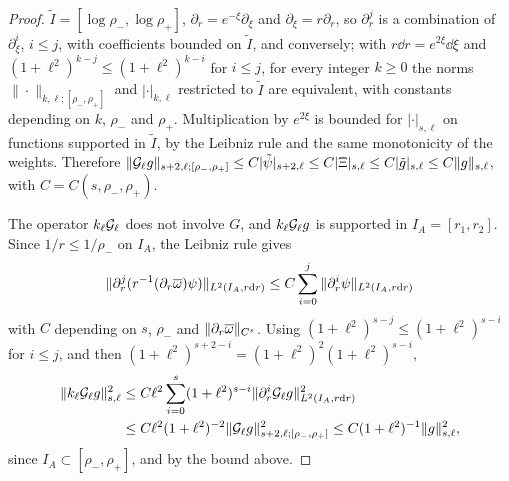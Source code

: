 \begin{proof}
$\tilde I=[\log\rho_-,\log\rho_+]$, $\partial_r=e^{-\xi}\partial_\xi$ and $\partial_\xi=r\partial_r$,
so $\partial_r^j$ is a combination of $\partial_\xi^i$, $i\le j$, with coefficients
bounded on $\tilde I$, and conversely; with $r\dd r=e^{2\xi}\dd\xi$ and
$(1+\ell^2)^{k-j}\le(1+\ell^2)^{k-i}$ for $i\le j$, for every integer $k\ge0$ the norms
$\|\cdot\|_{k,\ell;[\rho_-,\rho_+]}$ and $|\cdot|_{k,\ell}$ restricted to $\tilde I$ are
equivalent, with constants depending on $k$, $\rho_-$ and $\rho_+$. Multiplication
by $e^{2\xi}$ is bounded for $|\cdot|_{s,\ell}$ on functions supported in $\tilde I$,
by the Leibniz rule and the same monotonicity of the weights. Therefore
$\|\mathcal{G}_\ell g\|_{s+2,\ell;[\rho_-,\rho_+]}\le C|\tilde\psi|_{s+2,\ell}\le C|\Xi|_{s,\ell}
\le C|\tilde g|_{s,\ell}\le C\|g\|_{s,\ell}$, with $C=C(s,\rho_-,\rho_+)$.

The operator $k_\ell\mathcal{G}_\ell$ does not involve $G$, and
$k_\ell\mathcal{G}_\ell g$ is supported in $I_A=[r_1,r_2]$. Since $1/r\le1/\rho_-$ on
$I_A$, the Leibniz rule gives
\[
\|\partial_r^j(r^{-1}(\partial_r\overline{\omega})\psi)\|_{L^2(I_A,r\dd r)}\le C\sum_{i=0}^{j}\|\partial_r^i\psi\|_{L^2(I_A,r\dd r)}
\]
with $C$ depending on $s$, $\rho_-$ and $\|\partial_r\overline{\omega}\|_{C^s}$. Using
$(1+\ell^2)^{s-j}\le(1+\ell^2)^{s-i}$ for $i\le j$, and then
$(1+\ell^2)^{s+2-i}=(1+\ell^2)^2(1+\ell^2)^{s-i}$,
\begin{align*}
\|k_\ell\mathcal{G}_\ell g\|_{s,\ell}^2&\le C\ell^2\sum_{i=0}^{s}(1+\ell^2)^{s-i}\|\partial_r^i\mathcal{G}_\ell g\|^2_{L^2(I_A,r\dd r)}\\
&\le C\ell^2(1+\ell^2)^{-2}\|\mathcal{G}_\ell g\|^2_{s+2,\ell;[\rho_-,\rho_+]}\le C(1+\ell^2)^{-1}\|g\|^2_{s,\ell},
\end{align*}
since $I_A\subset[\rho_-,\rho_+]$, and by the bound above.
\end{proof}

